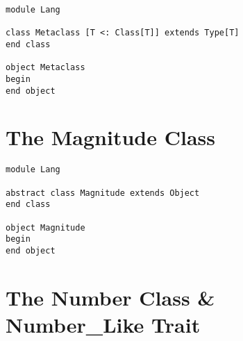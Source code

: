 \begin{lstlisting}
module Lang

class Metaclass [T <: Class[T]] extends Type[T]
end class

object Metaclass
begin
end object
\end{lstlisting}






\section{The Magnitude Class}
\label{sec:lang-magnitude}

\begin{lstlisting}
module Lang

abstract class Magnitude extends Object
end class

object Magnitude
begin
end object
\end{lstlisting}






\section{The Number Class \& Number\_Like Trait}
\label{sec:lang-number}

